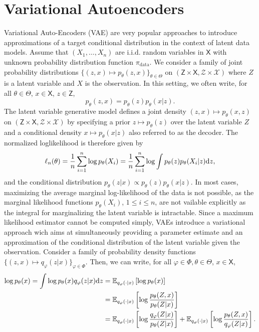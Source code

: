 \documentclass[english,graybox,envcountchap,envcountsame,sectrefs,shortlabels]{svmono}
\theoremstyle{style}
\newcommand{\eqsp}{}
\begin{document}
\section{Variational Autoencoders}
Variational Auto-Encoders (VAE) are very popular approaches to introduce approximations of a target conditional distribution in the context of latent data models. Assume that $(X_1,\ldots,X_n)$ are i.i.d. random variables in $\mathsf{X}$ with unknown probability distribution function $\pi_{\mathrm{data}}$. We consider a family of joint probability distributions $\{(z,x) \mapsto  p_{\theta}(z,x)\}_{\theta\in\Theta}$ on $(\mathsf{Z}\times \mathsf{X}, \mathcal{Z}\times \mathcal{X})$ where $Z$ is a latent variable and $X$ is the observation. In this setting, we often write, for all $\theta\in\Theta$, $x\in\mathsf{X}$, $z\in\mathsf{Z}$,
$$
p_{\theta}(z,x) = p_{\theta}(z)p_{\theta}(x|z)\eqsp.
$$
The latent variable generative model defines a joint density $(z,x)\mapsto p_\theta(x, z)$  on $(\mathsf{Z}\times \mathsf{X}, \mathcal{Z}\times \mathcal{X})$  by specifying a prior $z\mapsto p_{\theta}(z)$ over the latent variable $Z$ and a conditional density $x\mapsto p_\theta(x|z)$ also referred to as the decoder.  The normalized loglikelihood is therefore given by
$$
\ell_n(\theta) = \frac{1}{n}\sum_{i=1}^n \log p_{\theta}(X_i) = \frac{1}{n}\sum_{i=1}^n \log \int p_{\theta}(z)p_{\theta}(X_i|z)\rmd z\eqsp,
$$
and the conditional distribution $p_{\theta}(z|x)\propto p_{\theta}(z)p_{\theta}(x|z)$. In most cases, maximizing the average
marginal log-likelihood of the data is not possible, as the marginal likelihood functions $p_{\theta}(X_i)$, $1\leqslant i \leqslant n$, are not vailable explicitly as the integral for marginalizing the latent variable is intractable.  Since a maximum likelihood estimator cannot be computed simply, VAEs introduce a variational approach wich aims at simultaneously providing a parameter estimate  and an approximation of the conditional distribution of the latent variable given the observation.  Consider a family of probability density functions $\{(z,x) \mapsto q_{\varphi}(z|x)\}_{\varphi\in\Phi}$. Then, we can write, for all $\varphi\in\Phi,\theta\in\Theta$, $x\in\mathsf{X}$,
\begin{align*}
\log p_\theta(x) = \int \log p_\theta(x) q_{\varphi}(z|x) \mathrm{d} z &= \mathbb{E}_{q_{\varphi}(\cdot|x)}\left[\log p_\theta(x)\right] \\
&= \mathbb{E}_{q_{\varphi}(\cdot|x)}\left[\log \frac{p_\theta(Z,x)}{p_\theta(Z|x)}\right] \\
&= \mathbb{E}_{q_{\varphi}(\cdot|x)}\left[\log \frac{q_{\varphi}(Z|x)}{p_\theta(Z|x)}\right]  + \mathbb{E}_{q_{\varphi}(\cdot|x)}\left[\log \frac{p_\theta(Z,x)}{q_{\varphi}(Z|x)}\right] .
\end{align*}
\end{document}
